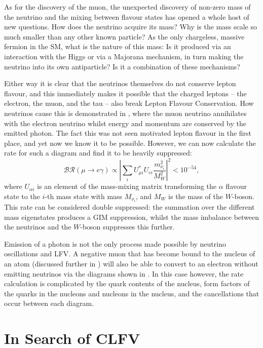 As for the discovery of the muon, the unexpected discovery  of non-zero mass of the neutrino and the mixing between flavour states has opened a whole host of new questions.
How does the neutrino acquire its mass?
  Why is the mass scale so much smaller than any other known particle?
As the only chargeless, massive fermion in the \ac{SM}, what is the nature of this mass:
Is it produced via an interaction with the Higgs or via a Majorana mechanism, in turn making the neutrino into its own antiparticle?
Is it a combination of these mechanisms?

\FigTheoryMuEConvViaNeutrino
Either way it is clear that the neutrinos themselves do not conserve lepton flavour, and this immediately makes it possible that the charged leptons -- the electron, the muon, and the tau -- also break Lepton Flavour Conservation.
How neutrinos cause this is demonstrated in , where the muon neutrino annihilates with the electron neutrino whilst energy and momentum are conserved by the emitted photon.
The fact this was not seen motivated lepton flavour in the first place, and yet now we know it to be possible.
However, we can now calculate the rate for such a diagram and find it to be heavily suppressed:
\begin{equation}
\mathcal{BR}(\mu\rightarrow{}e\gamma)\propto\left|\sum_iU^*_{\mu i}U_{ei} \frac{m^2_{\nu_i}}{M^2_W}\right|^2 < 10^{-54},
\end{equation}
where $U_{\alpha i}$ is an element of the mass-mixing matrix transforming the $\alpha$ flavour state to the $i$-th mass state with mass $M_{\nu_i}$, and $M_W$ is the mass of the $W$-boson.
This rate can be considered double suppressed: the summation over the different mass eigenstates produces a GIM suppression, whilst the mass imbalance between the neutrinos and the $W$-boson suppresses this further.

Emission of a photon is not the only process made possible by neutrino oscillations and \ac{LFV}.
A negative muon that has become bound to the nucleus of an atom (discussed further in ) will also be able to convert to an electron without emitting neutrinos via the diagrams
shown in .  
In this case however, the rate calculation is complicated by the quark contents of the nucleus, form factors of the quarks in the nucleons and nucleons in the nucleus, and the cancellations that occur between each diagram.

\section{In Search of \acf{CLFV}}
